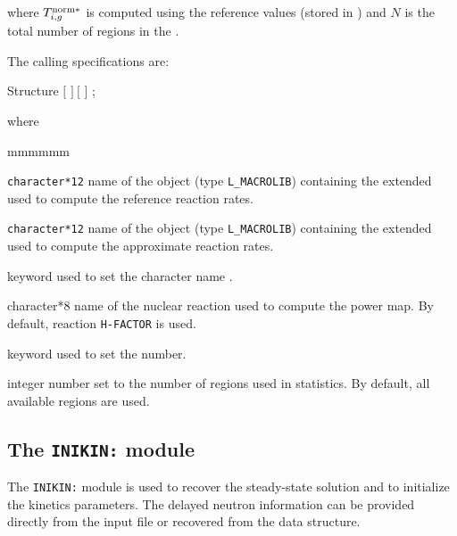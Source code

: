 \noindent where $T_{i,g}^{{\rm norm}*}$ is computed using the reference values (stored in ) and $N$ is the total number of regions in the .

\vskip 0.2cm
\goodbreak

The calling specifications are:

\begin{DataStructure}{Structure }
   \moc{::} $[$   $]~[$   $]$ ;
\end{DataStructure}

\noindent where
\begin{ListeDeDescription}{mmmmmm}

\item[\dusa{MACRO1}] {\tt character*12} name of the  object (type {\tt L\_MACROLIB}) containing the extended  used to compute the reference reaction rates.

\item[\dusa{MACRO2}] {\tt character*12} name of the  object (type {\tt L\_MACROLIB}) containing the extended  used to compute the approximate reaction rates.

\item[\moc{HREA}] keyword used to set the character name .

\item[\dusa{hname}] character*8 name of the nuclear reaction used to compute the power map. By default, reaction {\tt H-FACTOR} is used.

\item[\moc{NREG}] keyword used to set the  number.

\item[\dusa{nreg}] integer number set to the number of regions used in statistics. By default, all available regions are used.

\end{ListeDeDescription}
\clearpage

\subsection{The {\tt INIKIN:} module}\label{sect:inikin}

The {\tt INIKIN:} module is used  to recover the steady-state solution and to initialize the kinetics parameters.
The delayed neutron information can be provided directly from the input file or recovered from the 
data structure.

